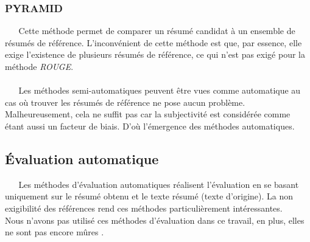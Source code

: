 \subsubsection{PYRAMID \cite{nenkova2004evaluating}}
$ _{} $ $ _{} $ $ _{} $ $ _{} $ $ _{} $Cette méthode permet de comparer un résumé candidat à un ensemble de résumés de référence. L'inconvénient de cette méthode est que, par essence, elle exige l'existence de plusieurs résumés de référence, ce qui n'est pas exigé pour la méthode \textit{ROUGE}.\\
$ _{} $ $ _{} $ $ _{} $ $ _{} $ $ _{} $\\
$ _{} $ $ _{} $ $ _{} $ $ _{} $ $ _{} $Les méthodes semi-automatiques peuvent être vues comme automatique au cas où trouver les résumés de référence ne pose aucun problème. Malheureusement, cela ne suffit pas car la subjectivité est considérée comme étant aussi un facteur de biais. D'où l'émergence des méthodes  automatiques.
\subsection{Évaluation automatique}
$ _{} $ $ _{} $ $ _{} $ $ _{} $ $ _{} $Les méthodes d'évaluation automatiques réalisent l'évaluation en se basant uniquement sur le résumé obtenu et le texte résumé (texte d'origine). La non exigibilité des références rend ces méthodes particulièrement intéressantes.\\
Nous n'avons pas utilisé ces méthodes d'évaluation dans ce travail, en plus, elles ne sont pas encore mûres \cite{MaaliMnasri,louis2008automatic,radev2003evaluation}.
